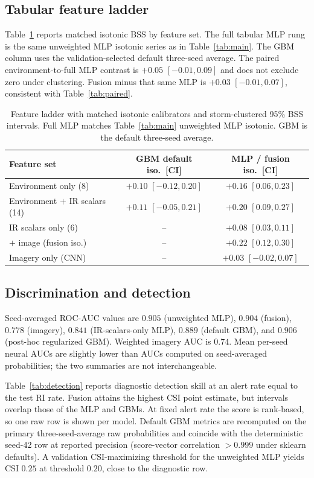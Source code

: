 \documentclass[11pt]{article}
\begin{document}
\subsection{Tabular feature ladder}

Table~\ref{tab:ladder} reports matched isotonic BSS by feature set. The full tabular MLP rung is the same unweighted MLP isotonic series as in Table~\ref{tab:main}. The GBM column uses the validation-selected default three-seed average. The paired environment-to-full MLP contrast is $+0.05$ $[-0.01,0.09]$ and does not exclude zero under clustering. Fusion minus that same MLP is $+0.03$ $[-0.01,0.07]$, consistent with Table~\ref{tab:paired}.

\begin{table}[H]
\centering
\caption{Feature ladder with matched isotonic calibrators and storm-clustered 95\% BSS intervals. Full MLP matches Table~\ref{tab:main} unweighted MLP isotonic. GBM is the default three-seed average.}
\label{tab:ladder}
\begin{tabular}{lcc}
\toprule
Feature set & GBM default iso.\ [CI] & MLP / fusion iso.\ [CI] \\
\midrule
Environment only (8) & $+0.10$ $[-0.12,0.20]$ & $+0.16$ $[0.06,0.23]$ \\
Environment $+$ IR scalars (14) & $+0.11$ $[-0.05,0.21]$ & $+0.20$ $[0.09,0.27]$ \\
IR scalars only (6) & -- & $+0.08$ $[0.03,0.11]$ \\
$+$ image (fusion iso.) & -- & $+0.22$ $[0.12,0.30]$ \\
Imagery only (CNN) & -- & $+0.03$ $[-0.02,0.07]$ \\
\bottomrule
\end{tabular}
\end{table}

\subsection{Discrimination and detection}

Seed-averaged ROC-AUC values are $0.905$ (unweighted MLP), $0.904$ (fusion), $0.778$ (imagery), $0.841$ (IR-scalars-only MLP), $0.889$ (default GBM), and $0.906$ (post-hoc regularized GBM). Weighted imagery AUC is $0.74$. Mean per-seed neural AUCs are slightly lower than AUCs computed on seed-averaged probabilities; the two summaries are not interchangeable.

Table~\ref{tab:detection} reports diagnostic detection skill at an alert rate equal to the test RI rate. Fusion attains the highest CSI point estimate, but intervals overlap those of the MLP and GBMs. At fixed alert rate the score is rank-based, so one raw row is shown per model. Default GBM metrics are recomputed on the primary three-seed-average raw probabilities and coincide with the deterministic seed-42 row at reported precision (score-vector correlation $>0.999$ under sklearn defaults). A validation CSI-maximizing threshold for the unweighted MLP yields CSI $0.25$ at threshold $0.20$, close to the diagnostic row.
\end{document}
